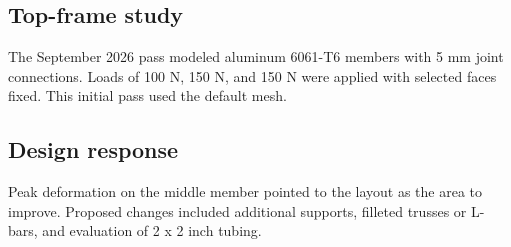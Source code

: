 \subsection*{Top-frame study}
The September 2026 pass modeled aluminum 6061-T6 members with 5 mm joint connections. Loads of 100 N, 150 N, and 150 N were applied with selected faces fixed. This initial pass used the default mesh.
\subsection*{Design response}
Peak deformation on the middle member pointed to the layout as the area to improve. Proposed changes included additional supports, filleted trusses or L-bars, and evaluation of 2 x 2 inch tubing.